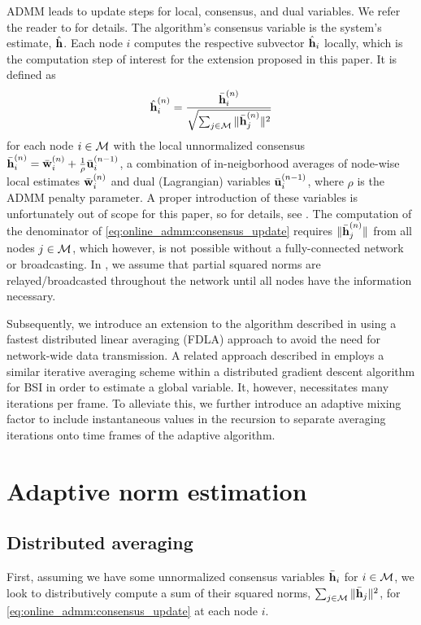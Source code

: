 \documentclass{article}
\begin{document}
ADMM leads to update steps for local, consensus, and dual variables.
We refer the reader to \cite{blochbergerDBSI} for details.
The algorithm's consensus variable is the system's estimate, \(\hat{\bm{\mathrm{h}}}\).
Each node \(i\) computes the respective subvector \(\hat{\bm{\mathrm{h}}}_i\) locally, which is the computation step of interest for the extension proposed in this paper.
It is defined as
\begin{equation}
    \hat{\bm{\mathrm{h}}}_i^{(n)} = \frac{\bar{\bm{\mathrm{h}}}_i^{(n)}}{\sqrt{\sum_{j \in \mathcal{M}} \|\bar{\bm{\mathrm{h}}}_j^{(n)}\|^2}}\label{eq:online_admm:consensus_update}
\end{equation}
for each node \(i \in \mathcal{M}\) with the local unnormalized consensus \(\bar{\bm{\mathrm{h}}}_i^{(n)} = \bar{\bm{\mathrm{w}}}_i^{(n)} + \frac{1}{\rho} \bar{\bm{\mathrm{u}}}_i^{(n-1)}\), a combination of in-neigborhood averages of node-wise local estimates \(\bar{\bm{\mathrm{w}}}_i^{(n)}\) and dual (Lagrangian) variables \(\bar{\bm{\mathrm{u}}}_i^{(n-1)}\), where \(\rho\) is the ADMM penalty parameter.
A proper introduction of these variables is unfortunately out of scope for this paper, so for details, see \cite{blochbergerDBSI}.
The computation of the denominator of \eqref{eq:online_admm:consensus_update} requires  \(\|\bar{\bm{\mathrm{h}}}_j^{(n)}\|\) from all nodes \(j \in \mathcal{M}\), which however, is not possible without a fully-connected network or broadcasting.
In \cite{blochbergerDBSI}, we assume that partial squared norms are relayed/broadcasted throughout the network until all nodes have the information necessary.

Subsequently, we introduce an extension to the algorithm described in \cite{blochbergerDBSI} using a fastest distributed linear averaging (FDLA) approach \cite{xiaoFastLinearIterations2004} to avoid the need for network-wide data transmission.
A related approach described in \cite{yuDistributedBlindSystem2014,liuDistributedBlindIdentification2016} employs a similar iterative averaging scheme within a distributed gradient descent algorithm for BSI in order to estimate a global variable.
It, however, necessitates many iterations per frame.
To alleviate this, we further introduce an adaptive mixing factor to include instantaneous values in the recursion to separate averaging iterations onto time frames of the adaptive algorithm.

\section{Adaptive norm estimation}
\label{sec:adaptivenormest}

\subsection[]{Distributed averaging}
First, assuming we have some unnormalized consensus variables \(\bar{\bm{\mathrm{h}}}_i\) for \(i \in \mathcal{M}\), we look to distributively compute a sum of their squared norms, \(\sum_{j \in \mathcal{M}} \|\bar{\bm{\mathrm{h}}}_j\|^2\), for \eqref{eq:online_admm:consensus_update} at each node \(i\).
\end{document}
